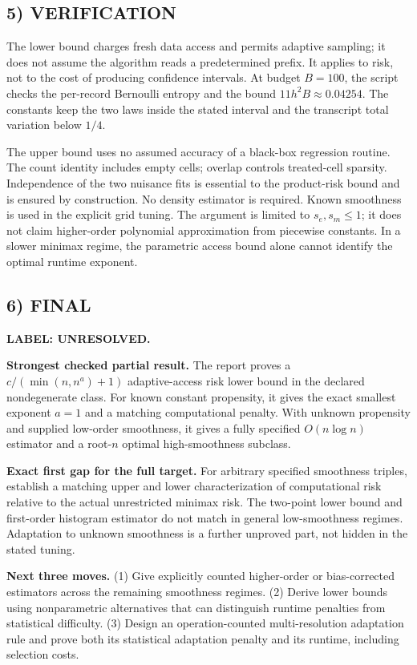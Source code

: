 \documentclass[11pt,a4paper]{article}
\theoremstyle{definition}
\newcommand{\unresolved}{\textbf{LABEL: UNRESOLVED.}}
\begin{document}
\subsection*{5) VERIFICATION}
The lower bound charges fresh data access and permits adaptive sampling; it does not assume the algorithm reads a predetermined prefix. It applies to risk, not to the cost of producing confidence intervals. At budget $B=100$, the script checks the per-record Bernoulli entropy and the bound $11h^2B\approx0.04254$. The constants keep the two laws inside the stated interval and the transcript total variation below $1/4$.

The upper bound uses no assumed accuracy of a black-box regression routine. The count identity includes empty cells; overlap controls treated-cell sparsity. Independence of the two nuisance fits is essential to the product-risk bound and is ensured by construction. No density estimator is required. Known smoothness is used in the explicit grid tuning. The argument is limited to $s_e,s_m\le1$; it does not claim higher-order polynomial approximation from piecewise constants. In a slower minimax regime, the parametric access bound alone cannot identify the optimal runtime exponent.

\subsection*{6) FINAL}
\unresolved

\textbf{Strongest checked partial result.} The report proves a $c/(\min(n,n^a)+1)$ adaptive-access risk lower bound in the declared nondegenerate class. For known constant propensity, it gives the exact smallest exponent $a=1$ and a matching computational penalty. With unknown propensity and supplied low-order smoothness, it gives a fully specified $O(n\log n)$ estimator and a root-$n$ optimal high-smoothness subclass.

\textbf{Exact first gap for the full target.} For arbitrary specified smoothness triples, establish a matching upper and lower characterization of computational risk relative to the actual unrestricted minimax risk. The two-point lower bound and first-order histogram estimator do not match in general low-smoothness regimes. Adaptation to unknown smoothness is a further unproved part, not hidden in the stated tuning.

\textbf{Next three moves.} (1) Give explicitly counted higher-order or bias-corrected estimators across the remaining smoothness regimes. (2) Derive lower bounds using nonparametric alternatives that can distinguish runtime penalties from statistical difficulty. (3) Design an operation-counted multi-resolution adaptation rule and prove both its statistical adaptation penalty and its runtime, including selection costs.
\end{document}
